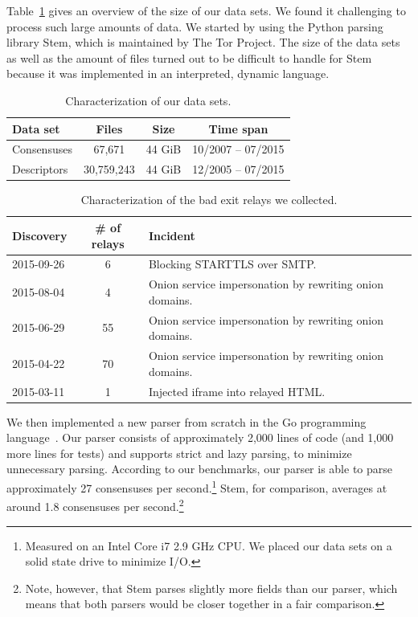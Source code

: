 Table~\ref{tab:collector-dataset} gives an overview of the size of our data
sets.  We found it challenging to process such large amounts of data.  We
started by using the Python parsing library Stem, which is maintained by The Tor
Project.  The size of the data sets as well as the amount of files turned out to
be difficult to handle for Stem because it was implemented in an interpreted,
dynamic language.

\begin{table}[t]
\centering
\begin{tabular}{l c c c}
\textbf{Data set} & \textbf{Files} & \textbf{Size} & \textbf{Time span} \\
\hline
Consensuses & 67,671 & 44 GiB & 10/2007 -- 07/2015 \\
Descriptors & 30,759,243 & 44 GiB & 12/2005 -- 07/2015 \\
\end{tabular}
\caption{Characterization of our data sets.}
\label{tab:collector-dataset}
\end{table}

\begin{table}[t]
\centering
\begin{tabular}{l c p{4cm}}
\textbf{Discovery} & \textbf{\# of relays} & \textbf{Incident} \\
\hline
2015-09-26 & 6 & Blocking STARTTLS over SMTP. \\
2015-08-04 & 4 & Onion service impersonation by rewriting onion domains. \\
2015-06-29 & 55 & Onion service impersonation by rewriting onion domains. \\
2015-04-22 & 70 & Onion service impersonation by rewriting onion domains. \\
2015-03-11 & 1 & Injected iframe into relayed HTML. \\
\end{tabular}
\caption{Characterization of the bad exit relays we collected.}
\label{tab:exitmap-dataset}
\end{table}

We then implemented a new parser from scratch in the Go programming
language~\cite{zoossh}.  Our parser consists of approximately 2,000 lines of
code (and 1,000 more lines for tests) and supports strict and lazy parsing, to
minimize unnecessary parsing.  According to our benchmarks, our parser is able
to parse approximately 27 consensuses per second.\footnote{Measured on an Intel
Core i7 2.9 GHz CPU.  We placed our data sets on a solid state drive to
minimize I/O.}  Stem, for comparison, averages at around 1.8 consensuses per
second.\footnote{Note, however, that Stem parses slightly more fields than our
parser, which means that both parsers would be closer together in a fair
comparison.}

